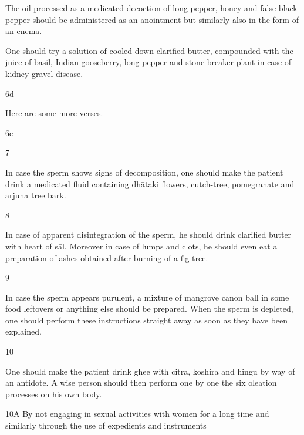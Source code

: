 \begin{translation}
\begin{tt}
 
  The oil processed as a medicated decoction of long pepper, honey and false 
  black pepper should be administered as an anointment but similarly also in the 
  form of an enema. 
 
 
  One should try a solution of cooled-down clarified butter, compounded with the 
  juice of basil, Indian gooseberry, long pepper and stone-breaker plant in case of 
  kidney gravel disease.
 
 \item[6d]
 
  Here are some more verses.
 
 \item[6e]
 
 \item[7]
 
  In case the sperm shows signs of decomposition, one should make the patient 
  drink a medicated fluid containing dhātaki flowers, cutch-tree, pomegranate 
  and arjuna tree bark.
 
 \item[8]
 
  In case of apparent disintegration of the sperm, he should drink clarified butter 
  with heart of sāl. Moreover in case of lumps and clots, he should even eat a 
  preparation of ashes obtained after burning of a fig-tree.
 
 \item[9]
 
  In case the sperm appears purulent, a mixture of mangrove canon ball in some 
  food leftovers or anything else should be prepared. When the sperm is 
  depleted, one should perform these instructions straight away as soon as they 
  have been explained.
 
 \item[10]
 
  One should make the patient drink ghee with citra, koshira and hingu by way of 
  an antidote. A wise person should then perform one by one the six oleation 
  processes on his own body.
  
  
  
\item[10A]  By not engaging in sexual activities with women for a long time and 
similarly 
  through the use of expedients and instruments
  

\end{tt}
\end{translation}
